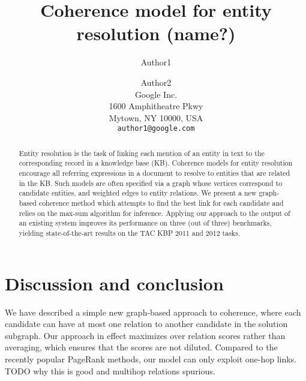 \documentclass[11pt,letterpaper]{article}
\title{Coherence model for entity resolution (name?)}
\author{Author1 \and Author2\\
	    Google Inc. \\
	    1600 Amphitheatre Pkwy\\
	    Mytown, NY 10000, USA\\
	    {\tt author1@google.com}}
\date{}
\begin{document}
\maketitle

\begin{abstract}
Entity resolution is the task of linking each mention of an entity in text to the corresponding record in a knowledge base (KB). Coherence models for entity resolution encourage all referring expressions in a document to resolve to entities that are related in the KB. 
Such models are often specified via a graph whose vertices correspond to candidate entities, and weighted edges to entity relations. We present a new graph-based coherence method which attempts to find the best link for each candidate and relies on the max-sum algorithm for inference.  Applying our approach to the output of an existing system improves its performance on three (out of three) benchmarks, yielding state-of-the-art results on the TAC KBP 2011 and 2012 tasks.
\end{abstract}







\section{Discussion and conclusion}

We have described a simple new graph-based approach to coherence, where each candidate can have at most one relation to another candidate in the solution subgraph. Our approach in effect maximizes over relation scores rather than averaging, which ensures that the scores are not diluted. Compared to the recently popular PageRank methods, our model can only exploit one-hop links. TODO why this is good and multihop relations spurious.





\end{document}
